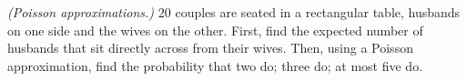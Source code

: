 \begin{problem}[Handout 10, \# 17 (a)]
  \emph{(Poisson approximations.)} \(20\) couples are seated in a
  rectangular table, husbands on one side and the wives on the
  other. First, find the expected number of husbands that sit directly
  across from their wives. Then, using a Poisson approximation, find the
  probability that two do; three do; at most five do.
\end{problem}
\begin{solution}

\end{solution}

